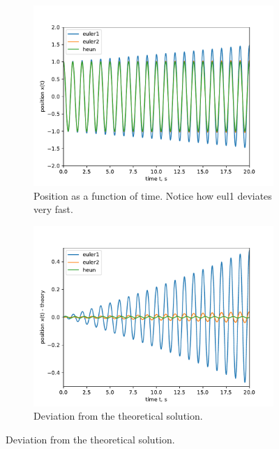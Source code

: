 \documentclass[]{article}
\begin{document}
	\begin{figure}[!htb]
		\hfill
		\begin{subfigure}[t]{0.48\textwidth}
			\centering
			\includegraphics[width=\textwidth]{figures/eul12+heun.pdf}
			\caption{Position as a function of time. Notice how eul1 deviates very fast.\label{subfig:sho-pos}}
		\end{subfigure}
		\hfill
		\begin{subfigure}[t]{0.48\textwidth}
			\centering
			\includegraphics[width=\textwidth]{figures/eul12+heun-theory.pdf}
			\caption{Deviation from the theoretical solution.\label{subfig:sho-dev}}
		\end{subfigure}
		\hfill


\end{figure}
\end{document}
